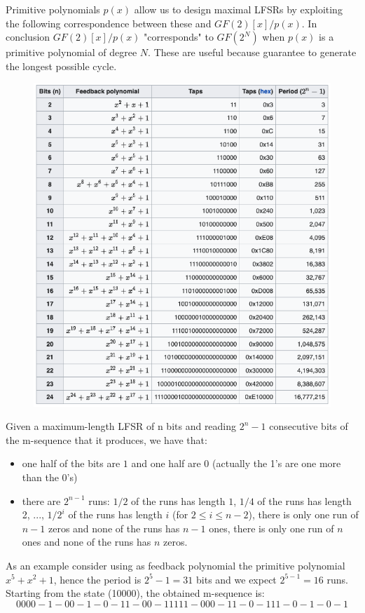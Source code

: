 Primitive polynomials $p(x)$ allow us to design maximal LFSRs by exploiting the following correspondence between these and $GF(2)[x]/p(x)$. In conclusion $GF(2)[x]/p(x)$ "corresponds" to $GF(2^N)$ when $p(x)$ is a primitive polynomial of degree $N$. These are useful because guarantee to generate the longest possible cycle.

\begin{figure}
	\centering
	\includegraphics[width=0.7\linewidth]{Images/Chapter2/screenshot007}
	\caption{}
	\label{fig:chapter2_screenshot007}
\end{figure}

Given a maximum-length LFSR of n bits and reading $2^n - 1$ consecutive bits of the m-sequence that it produces, we have that:

\begin{itemize}
	\item one half of the bits are $1$ and one half are $0$ (actually the 1’s are one more than the 0’s)
	\item there are $2^{n-1}$ runs: $1/2$ of the runs has length $1$, $1/4$ of the runs has length 2, ..., $1/2^i$ of the runs has length $i$ (for $2 \le i \le n - 2$), there is only one run of $n-1$ zeros and none of the runs has $n-1$ ones, there is only one run of $n$ ones and none of the runs has $n$ zeros.
\end{itemize}

As an example consider using as feedback polynomial the primitive polynomial $x^5 + x^2 + 1$, hence the period is $2^5 - 1 = 31$ bits and we expect $2^{5-1} = 16$ runs. Starting from the state (10000), the obtained m-sequence is:
\[0000-1-00-1-0-11-00-11111-000-11-0-111-0-1-0-1\]

